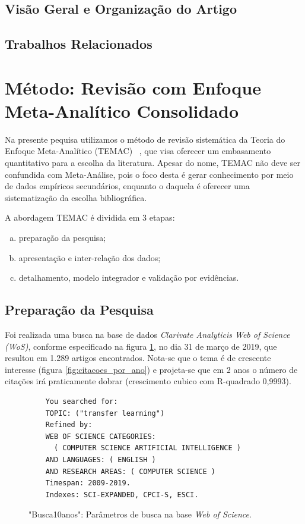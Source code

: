 \documentclass[sigconf]{acmart}
\begin{document}
  \subsection{Visão Geral e Organização do Artigo}
  \lipsum[3]
  \subsection{Trabalhos Relacionados}
  \lipsum[2]
\section{Método: Revisão com Enfoque Meta-Analítico Consolidado}\label{TEMAC}
Na presente pequisa utilizamos o método de revisão sistemática da Teoria do Enfoque Meta-Analítico (TEMAC) ~\cite{Mariano}, que visa oferecer um embasamento quantitativo para a escolha da literatura. Apesar do nome, TEMAC não deve ser confundida com Meta-Análise, pois o foco desta é gerar conhecimento por meio de dados empíricos secundários, enquanto o daquela é oferecer uma sistematização da escolha bibliográfica.

A abordagem TEMAC é dividida em 3 etapas: 
\begin{enumerate}[a)]
  \item preparação da pesquisa;
  \item apresentação e inter-relação dos dados;
  \item detalhamento, modelo integrador e validação por evidências.
\end{enumerate}

\subsection{Preparação da Pesquisa}
Foi realizada uma busca na base de dados \emph{Clarivate Analyticis Web of Science (WoS)}, conforme especificado na figura \ref{card:wos}, no dia 31 de março de 2019, que resultou em 1.289 artigos encontrados. Nota-se que o tema é de crescente interesse (figura \ref{fig:citacoes_por_ano}) e projeta-se que em 2 anos o número de citações irá praticamente dobrar (crescimento cubico com R-quadrado 0,9993). 
\begin{figure}[htp]

\begin{tcolorbox}[colback=yellow!5!white,colframe=gray!75!black,title={Results: 1,289 (from Web of Science Core Collection)}]
  \footnotesize{
    \begin{verbatim}
    You searched for: 
    TOPIC: ("transfer learning")
    Refined by: 
    WEB OF SCIENCE CATEGORIES: 
      ( COMPUTER SCIENCE ARTIFICIAL INTELLIGENCE )
    AND LANGUAGES: ( ENGLISH ) 
    AND RESEARCH AREAS: ( COMPUTER SCIENCE )
    Timespan: 2009-2019. 
    Indexes: SCI-EXPANDED, CPCI-S, ESCI.
    \end{verbatim}
  }

\end{tcolorbox}
\caption{"Busca10anos": Parâmetros de busca na base \emph{Web of Science}.}
\label{card:wos}
\end{figure}
\end{document}
